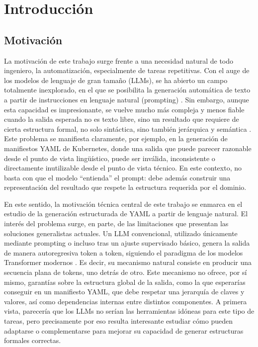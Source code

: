 %
\chapter{Introducción}
\label{ch::chapter1}

\section{Motivación}

La motivación de este trabajo surge frente a una necesidad natural de todo ingeniero, la automatización, especialmente de tareas repetitivas. Con el auge de los modelos de lenguaje de gran tamaño (LLMs), se ha abierto un campo totalmente inexplorado,
en el que se posibilita la generación automática de texto a partir de instrucciones en lenguaje natural (prompting) \citep{zhao2023surveyllm, liu2023pretrain}. Sin embargo, aunque esta capacidad es impresionante, se vuelve mucho más compleja y menos fiable cuando la salida esperada no es
texto libre, sino un resultado que requiere de cierta estructura formal, no solo sintáctica, sino también jerárquica y semántica \citep{yang2025structeval, li2023strucbench}. Este problema se manifiesta claramente, por ejemplo, en la generación de manifiestos YAML de Kubernetes, donde una salida que
puede parecer razonable desde el punto de vista lingüístico, puede ser inválida, inconsistente o directamente inutilizable desde el punto de vista técnico. En este contexto, no basta con que el modelo ``entienda'' el prompt: debe además construir una
representación del resultado que respete la estructura requerida por el dominio.

En este sentido, la motivación técnica central de este trabajo se enmarca en el estudio de la generación estructurada de YAML a partir de lenguaje natural. El interés del problema surge, en parte, de las limitaciones que presentan las soluciones generalistas
actuales. Un LLM convencional, utilizado únicamente mediante prompting o incluso tras un ajuste supervisado básico, genera la salida de manera autoregresiva token a token, siguiendo el paradigma de los modelos Transformer modernos \citep{vaswani2017attention}. Es decir, su mecanismo natural consiste en producir una secuencia plana de tokens,
uno detrás de otro. Este mecanismo no ofrece, por sí mismo, garantías sobre la estructura global de la salida, como la que esperarías conseguir en un manifiesto YAML, que debe respetar una jerarquía de claves y valores, así como dependencias internas entre distintos componentes.
A primera vista, parecería que los LLMs no serían las herramientas idóneas para este tipo de tareas, pero precisamente por eso resulta interesante estudiar cómo pueden adaptarse o complementarse para mejorar su capacidad de generar estructuras formales correctas.

